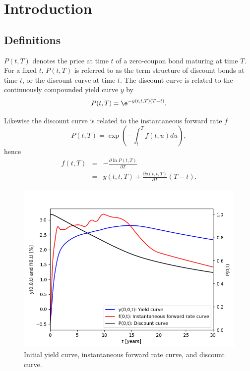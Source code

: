 \chapter{Introduction}

\section{Definitions}

$P(t,T)$ denotes the price at time $t$ of a zero-coupon bond maturing at time $T$. 
For a fixed $t$, $P(t,T)$ is referred to as the term structure of discount bonds 
at time $t$, or the discount curve at time $t$.
The discount curve is related to the continuously compounded yield curve $y$ by
\begin{equation}
P(t,T) = \e^{-y(t,t,T) (T - t)}.
\end{equation}

Likewise the discount curve is related to the instantaneous forward rate $f$
\begin{equation}
P(t,T) = \exp \left( -\int_t^T f(t,u) du \right),
\end{equation}
hence
\begin{eqnarray}
f(t,T) &=& - \frac{\partial \ln P(t,T)}{\partial T} \\
&=& y(t,t,T) + \frac{\partial y(t,t,T)}{\partial T} (T - t).
\end{eqnarray}

\begin{figure}
\includegraphics[scale=0.7]{figures/swap_curve.png}
\caption{Initial yield curve, instantaneous forward rate curve, and 
discount curve.}
\end{figure}
